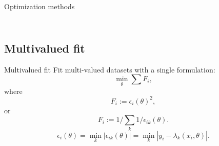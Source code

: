 \documentclass{beamer}
\begin{document}
\begin{frame}{Optimization methods}
\begin{columns}
\begin{column}{0.5\textwidth}
\begin{figure}[h]
                \label{fig:perform}
            \end{figure}
        \end{column}
    \end{columns}
\end{frame}


\subsection{Multivalued fit}
\begin{frame}{Multivalued fit}
    Fit multi-valued datasets with a single formulation:
    \begin{equation}
        \min_\theta \sum F_i,
    \end{equation}
    where
    \begin{equation}
        F_i := \epsilon_i(\theta)^2,
    \end{equation}
    or
    \begin{equation}
        F_i := 1/\sum_k 1/\epsilon_{ik}(\theta).
    \end{equation}
    \begin{equation}
        \epsilon_i(\theta) = \min_k \left|\epsilon_{ik}(\theta)\right| = \min_k \left|y_i - \lambda_k(x_i, \theta)\right|.
    \end{equation}
\end{frame}

\end{document}
